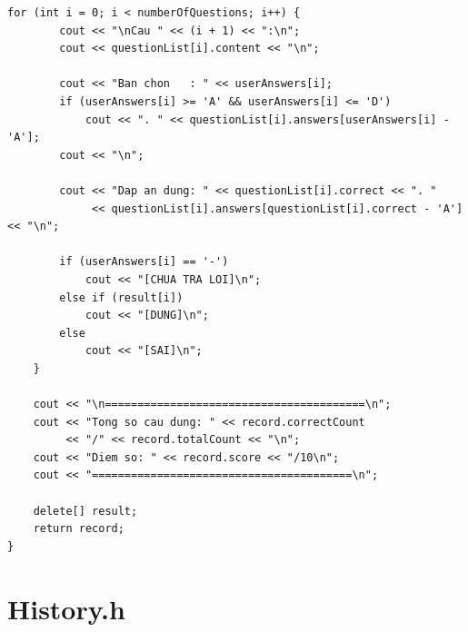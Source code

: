 \documentclass[11pt]{report}
\begin{document}
\begin{lstlisting}[caption={Exam.cpp -- Cài đặt logic sinh đề, xáo trộn, bộ đếm giờ}, label={lst:full_exam_cpp}]
    for (int i = 0; i < numberOfQuestions; i++) {
        cout << "\nCau " << (i + 1) << ":\n";
        cout << questionList[i].content << "\n";

        cout << "Ban chon   : " << userAnswers[i];
        if (userAnswers[i] >= 'A' && userAnswers[i] <= 'D')
            cout << ". " << questionList[i].answers[userAnswers[i] - 'A'];
        cout << "\n";

        cout << "Dap an dung: " << questionList[i].correct << ". "
             << questionList[i].answers[questionList[i].correct - 'A'] << "\n";

        if (userAnswers[i] == '-')
            cout << "[CHUA TRA LOI]\n";
        else if (result[i])
            cout << "[DUNG]\n";
        else
            cout << "[SAI]\n";
    }

    cout << "\n========================================\n";
    cout << "Tong so cau dung: " << record.correctCount
         << "/" << record.totalCount << "\n";
    cout << "Diem so: " << record.score << "/10\n";
    cout << "========================================\n";

    delete[] result;
    return record;
}
\end{lstlisting}

\section{History.h}
\end{document}
